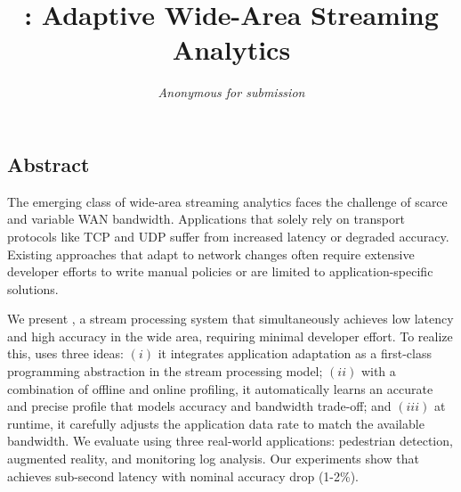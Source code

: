 \documentclass[twocolumn, 9pt]{article}
\begin{document}
\date{}



\title{\sysname{}: Adaptive Wide-Area Streaming Analytics}

\author{
  \textit{Anonymous for submission}
}

\maketitle

\subsection*{Abstract}

The emerging class of wide-area streaming analytics faces the challenge of
scarce and variable WAN bandwidth. Applications that solely rely on transport
protocols like TCP and UDP suffer from increased latency or degraded
accuracy. Existing approaches that adapt to network changes often require
extensive developer efforts to write manual policies or are limited to
application-specific solutions.

We present \sysname{}, a stream processing system that simultaneously achieves
low latency and high accuracy in the wide area, requiring minimal developer
effort. To realize this, \sysname{} uses three ideas: $(i)$ it integrates
application adaptation as a first-class programming abstraction in the stream
processing model; $(ii)$ with a combination of offline and online profiling, it
automatically learns an accurate and precise profile that models accuracy and
bandwidth trade-off; and $(iii)$ at runtime, it carefully adjusts the
application data rate to match the available bandwidth. We evaluate \sysname{}
using three real-world applications: pedestrian detection, augmented reality,
and monitoring log analysis. Our experiments show that \sysname{} achieves
sub-second latency with nominal accuracy drop (1-2\%).










% 

{\footnotesize 
}

\begin{appendices}

\end{appendices}
\end{document}
